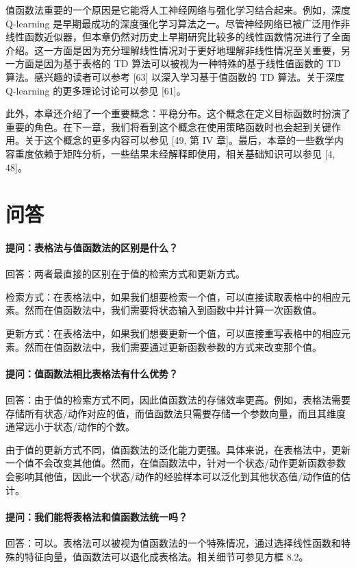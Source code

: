 值函数法重要的一个原因是它能将人工神经网络与强化学习结合起来。例如，深度 Q-learning 是早期最成功的深度强化学习算法之一。尽管神经网络已被广泛用作非线性函数近似器，但本章仍然对历史上早期研究比较多的线性函数情况进行了全面介绍。这一方面是因为充分理解线性情况对于更好地理解非线性情况至关重要，另一方面是因为基于表格的 TD 算法可以被视为一种特殊的基于线性值函数的 TD 算法。感兴趣的读者可以参考 [63] 以深入学习基于值函数的 TD 算法。关于深度 Q-learning 的更多理论讨论可以参见 [61]。

此外，本章还介绍了一个重要概念：平稳分布。这个概念在定义目标函数时扮演了重要的角色。在下一章，我们将看到这个概念在使用策略函数时也会起到关键作用。关于这个概念的更多内容可以参见 [49, 第 IV 章]。最后，本章的一些数学内容重度依赖于矩阵分析，一些结果未经解释即使用，相关基础知识可以参见 [4, 48]。

\section{问答}
\label{sec:rl-vfa-qa}

\paragraph{提问：表格法与值函数法的区别是什么？}回答：两者最直接的区别在于值的检索方式和更新方式。

检索方式：在表格法中，如果我们想要检索一个值，可以直接读取表格中的相应元素。然而在值函数法中，我们需要将状态输入到函数中并计算一次函数值。

更新方式：在表格法中，如果我们想要更新一个值，可以直接重写表格中的相应元素。然而在值函数法中，我们需要通过更新函数参数的方式来改变那个值。

\paragraph{提问：值函数法相比表格法有什么优势？}回答：由于值的检索方式不同，因此值函数法的存储效率更高。例如，表格法需要存储所有状态/动作对应的值，而值函数法只需要存储一个参数向量，而且其维度通常远小于状态/动作的个数。

由于值的更新方式不同，值函数法的泛化能力更强。具体来说，在表格法中，更新一个值不会改变其他值。然而，在值函数法中，针对一个状态/动作更新函数参数会影响其他值，因此一个状态/动作的经验样本可以泛化到其他状态值/动作值的估计。

\paragraph{提问：我们能将表格法和值函数法统一吗？}回答：可以。表格法可以被视为值函数法的一个特殊情况，通过选择线性函数和特殊的特征向量，值函数法可以退化成表格法。相关细节可参见方框 8.2。

